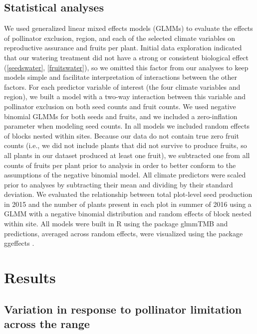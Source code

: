 \documentclass{article}
\begin{document}
\subsection*{Statistical analyses}

We used generalized linear mixed effects models (GLMMs) to evaluate the effects of pollinator exclusion, region, and each of the selected climate variables on reproductive assurance and fruits per plant. Initial data exploration indicated that our watering treatment did not have a strong or consistent biological effect (\autoref{seedswater}, \autoref{fruitswater}), so we omitted this factor from our analyses to keep models simple and facilitate interpretation of interactions between the other factors. For each predictor variable of interest (the four climate variables and region), we built a model with a two-way interaction between this variable and pollinator exclusion on both seed counts and fruit counts. We used negative binomial GLMMs for both seeds and fruits, and we included a zero-inflation parameter when modeling seed counts. In all models we included random effects of blocks nested within sites. Because our data do not contain true zero fruit counts (i.e., we did not include plants that did not survive to produce fruits, so all plants in our dataset produced at least one fruit), we subtracted one from all counts of fruits per plant prior to analysis in order to better conform to the assumptions of the negative binomial model. All climate predictors were scaled prior to analyses by subtracting their mean and dividing by their standard deviation. We evaluated the relationship between total plot-level seed production in 2015 and the number of plants present in each plot in summer of 2016 using a GLMM with a negative binomial distribution and random effects of block nested within site. All models were built in R \citep{Rcore} using the package glmmTMB \citep{brooks2017glmmtmb} and predictions, averaged across random effects, were visualized using the package ggeffects \citep{ggeffects}.

\section*{Results}

\subsection*{Variation in response to pollinator limitation across the range}
\end{document}
